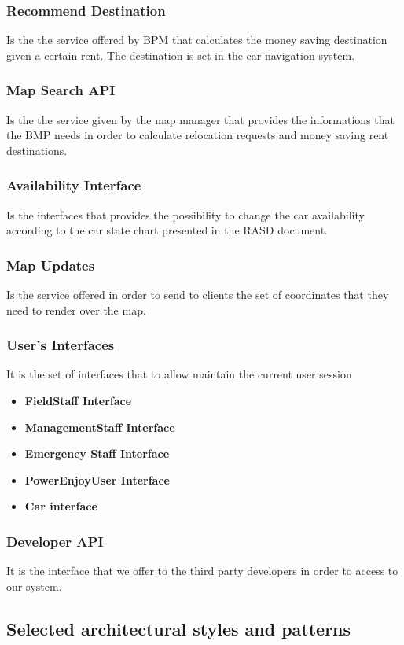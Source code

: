 \documentclass[english]{article}
\begin{document}
	\subsubsection*{Recommend Destination}
	Is the the service offered by BPM that calculates the money saving destination given a certain rent. The destination is set in the car navigation system.
	\subsubsection*{Map Search API}
	Is the the service given by the map manager that provides the informations that the BMP needs in order to calculate relocation requests and money saving rent destinations.
	\subsubsection*{Availability Interface}
	Is the interfaces that provides the possibility to change the car availability according to the car state chart presented in the RASD document. 
	\subsubsection*{Map Updates}
	Is the service offered in order to send to clients the set of coordinates that they need to render over the map.
	\subsubsection*{User's Interfaces}
	It is the  set of interfaces that to allow maintain the current user session
	\begin{itemize}
		\item\textbf{FieldStaff Interface}
		\item\textbf{ManagementStaff Interface}
		\item\textbf{Emergency Staff Interface}
		\item\textbf{PowerEnjoyUser Interface}
		\item\textbf{Car interface}
	\end{itemize}
	\subsubsection*{Developer API}
	It is the interface that we offer to the third party developers in order to access to our system.
	
\subsection{Selected architectural styles and patterns} %
\end{document}
